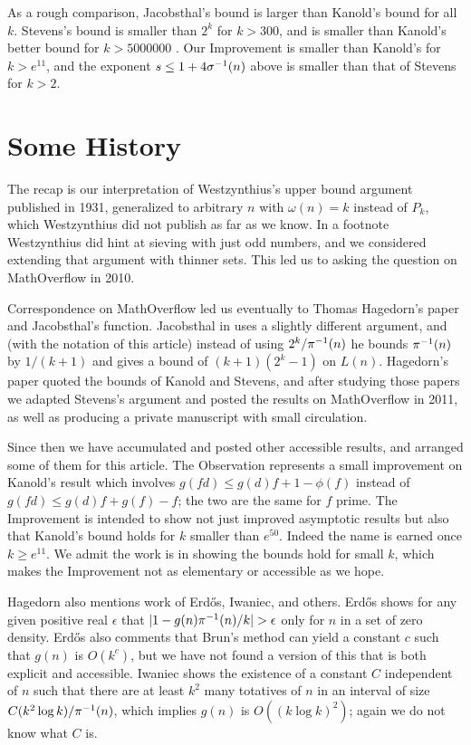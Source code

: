 \documentclass[12pt,leqno]{article}
\begin{document}
As a rough comparison, Jacobsthal's bound is larger than Kanold's bound for all $k$.
Stevens's bound is smaller than $2^k$ for $k>300$, and is smaller than Kanold's better
bound for $k > 5000000$ .  Our Improvement is smaller than Kanold's for $k \gt e^{11}$,
and the exponent $s \leq 1 + 4{\sigma}^{-1}(n)$ above is smaller than that of Stevens for $k \gt 2$.

\section{Some History}

The recap is our interpretation of Westzynthius's upper bound argument published in 1931, 
generalized to arbitrary $n$ with $\omega(n)=k$ instead of $P_k$, which 
Westzynthius did not publish as far as we know.  In a footnote
Westzynthius did hint at sieving with just odd numbers, 
and we considered extending that argument with thinner sets.  This led us to asking the 
question \cite{M} on MathOverflow in 2010. 

Correspondence on MathOverflow led us eventually to Thomas Hagedorn's paper 
\cite{H} and Jacobsthal's function.
Jacobsthal in \cite{J}  uses a slightly different argument, and (with the
notation of this article) instead of 
using $2^k / {\pi}^{-1}(n)$ he bounds ${\pi}^{-1}(n)$ by $1/(k+1)$ and gives a bound of $(k+1)(2^k-1)$ on $L(n)$.
Hagedorn's paper quoted the bounds of Kanold and Stevens, and after studying those papers we
adapted Stevens's argument and posted the results on MathOverflow in 2011, as well as producing a
private manuscript with small circulation.  

Since then we have 
accumulated and posted other accessible results, and arranged some of them for this article.
The Observation represents a small improvement on Kanold's result which involves 
$g(fd) \leq g(d)f + 1- \phi(f)$
instead of $g(fd) \leq g(d)f + g(f)-f$; the two are the same for $f$ prime.
The Improvement is intended to
show not just improved asymptotic results but also that Kanold's bound holds for 
$k$ smaller than $e^{50}$. Indeed the name is earned once $k \geq e^{11}$.
We admit the work is in showing the bounds hold for small $k$, which makes the Improvement not as
elementary or accessible as we hope.


Hagedorn also mentions work of Erd\H{o}s, Iwaniec, and others.  Erd\H{o}s shows
for any given positive real $\epsilon$ that $| 1 - g(n){\pi}^{-1}(n)/k | > \epsilon$ only for
$n$ in a set of zero density. Erd\H{o}s also comments that Brun's method can yield
a constant $c$ such that $g(n)$ is $O(k^c)$, but we have not found a version of this that is
both explicit and accessible.  Iwaniec shows the existence of a constant $C$ independent of $n$
such that there are at least $k^2$ many totatives of $n$ in an interval of size $C(k^2\log k)/{\pi}^{-1}(n)$,
which implies
$g(n)$ is $O((k\log k)^2)$; again we do not know what $C$ is.
\end{document}

